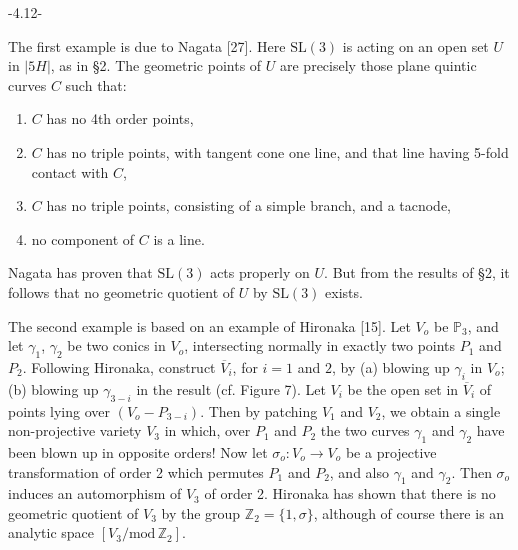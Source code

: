 \begin{center}-4.12-\end{center}
The first example is due to Nagata [27]. Here $\mathrm{SL}(3)$ is acting on an open set $U$ in $|5H|$, as in \S2. The geometric points of $U$ are precisely those plane quintic curves $C$ such that:

\begin{enumerate}
\item[i)] $C$ has no 4th order points,
\item[ii)] $C$ has no triple points, with tangent cone one line, and that line having 5-fold contact with $C$,
\item[iii)] $C$ has no triple points, consisting of a simple branch, and a tacnode,
\item[iv)] no component of $C$ is a line.
\end{enumerate}
Nagata has proven that $\mathrm{SL}(3)$ acts properly on $U$. But from the results of \S2, it follows that no geometric quotient of $U$ by $\mathrm{SL}(3)$ exists.

The second example is based on an example of Hironaka [15]. Let $V_o$ be $\mathbb P_3$, and let $\gamma_1$, $\gamma_2$ be two conics in $V_o$, intersecting normally in exactly two points $P_1$ and $P_2$. Following Hironaka, construct $\overline V_i$, for $i=1$ and $2$, by (a) blowing up $\gamma_i$ in $V_o$; (b) blowing up $\gamma_{3-i}$ in the result (cf. Figure 7). Let $V_i$ be the open set in $\overline V_i$ of points lying over $(V_o-P_{3-i})$. Then by patching $V_1$ and $V_2$, we obtain a single non-projective variety $V_3$ in which, over $P_1$ and $P_2$ the two curves $\gamma_1$ and $\gamma_2$ have been blown up in opposite orders! Now let $\sigma_o:V_o\longrightarrow V_o$ be a projective transformation of order 2 which permutes $P_1$ and $P_2$, and also $\gamma_1$ and $\gamma_2$. Then $\sigma_o$ induces an automorphism of $V_3$ of order 2. Hironaka has shown that there is no geometric quotient of $V_3$ by the group $\mathbb Z_2=\{1,\sigma\}$, although of course there is an analytic space $[V_3/\mathrm{mod}\,\mathbb Z_2]$.
